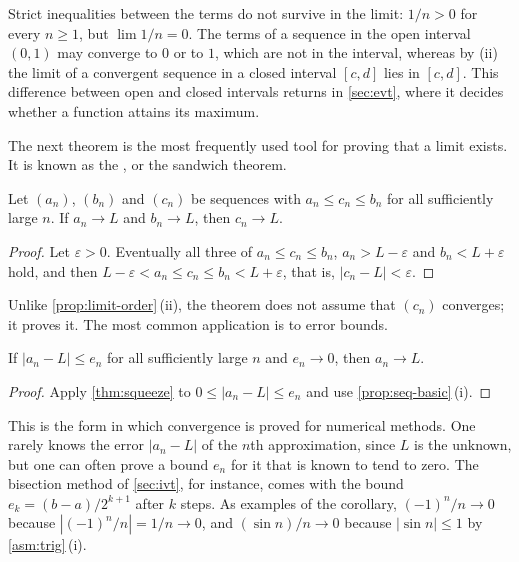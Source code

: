 Strict inequalities between the terms do not survive in the limit: $1/n>0$ for every $n\ge1$, but $\lim1/n=0$. The terms of a sequence in the open interval $(0,1)$ may converge to $0$ or to $1$, which are not in the interval, whereas by (ii) the limit of a convergent sequence in a closed interval $[c,d]$ lies in $[c,d]$. This difference between open and closed intervals returns in \cref{sec:evt}, where it decides whether a function attains its maximum.

The next theorem is the most frequently used tool for proving that a limit exists. It is known as the , or the sandwich theorem.

\begin{theorem}
\label{thm:squeeze}
Let $(a_n)$, $(b_n)$ and $(c_n)$ be sequences with $a_n\le c_n\le b_n$ for all sufficiently large $n$. If $a_n\to L$ and $b_n\to L$, then $c_n\to L$.
\end{theorem}

\begin{proof}
Let $\varepsilon>0$. Eventually all three of $a_n\le c_n\le b_n$, $a_n>L-\varepsilon$ and $b_n<L+\varepsilon$ hold, and then $L-\varepsilon<a_n\le c_n\le b_n<L+\varepsilon$, that is, $|c_n-L|<\varepsilon$.
\end{proof}

Unlike \cref{prop:limit-order}\,(ii), the theorem does not assume that $(c_n)$ converges; it proves it. The most common application is to error bounds.

\begin{corollary}
\label{cor:squeeze-zero}
If $|a_n-L|\le e_n$ for all sufficiently large $n$ and $e_n\to0$, then $a_n\to L$.
\end{corollary}

\begin{proof}
Apply \cref{thm:squeeze} to $0\le|a_n-L|\le e_n$ and use \cref{prop:seq-basic}\,(i).
\end{proof}

This is the form in which convergence is proved for numerical methods. One rarely knows the error $|a_n-L|$ of the $n$th approximation, since $L$ is the unknown, but one can often prove a bound $e_n$ for it that is known to tend to zero. The bisection method of \cref{sec:ivt}, for instance, comes with the bound $e_k=(b-a)/2^{k+1}$ after $k$ steps. As examples of the corollary, $(-1)^n/n\to0$ because $|(-1)^n/n|=1/n\to0$, and $(\sin n)/n\to0$ because $|\sin n|\le1$ by \cref{asm:trig}\,(i).

